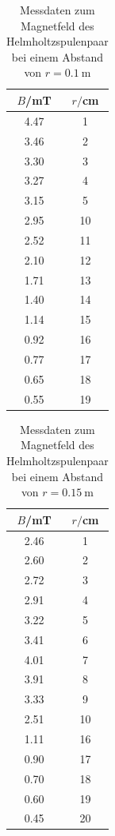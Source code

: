 \documentclass[
  bibliography=totoc,     %
  captions=tableheading,  %
  titlepage=firstiscover, %
]{scrartcl}
\begin{document}
  \newpage
  \begin{table}
    \centering
    \caption{Messdaten zum Magnetfeld des Helmholtzspulenpaar 
      bei einem Abstand von $r=\SI{0.1}{\metre}$}
    \label{tab:helmholtz1}
    \begin{tabular}{c c}
      \toprule
      $B$/mT & $r/$cm\\
      \midrule

      4.47 & 1\\
      3.46 & 2\\
      3.30 & 3\\
      3.27 & 4\\
      3.15 & 5\\
      2.95 & 10\\
      2.52 & 11\\
      2.10 & 12\\
      1.71 & 13\\
      1.40 & 14\\
      1.14 & 15\\
      0.92 & 16\\
      0.77 & 17\\
      0.65 & 18\\
      0.55 & 19\\
      
      \bottomrule
    \end{tabular}
  \end{table}

  \FloatBarrier

  \begin{table}
    \centering
    \caption{Messdaten zum Magnetfeld des Helmholtzspulenpaar 
      bei einem Abstand von $r=\SI{0.15}{\metre}$}
    \label{tab:helmholtz2}
    \begin{tabular}{c c}
      \toprule
      $B$/mT & $r/$cm\\
      \midrule
      2.46 & 1\\
      2.60 & 2\\
      2.72 & 3\\
      2.91 & 4\\
      3.22 & 5\\
      3.41 & 6\\
      4.01 & 7\\
      3.91 & 8\\
      3.33 & 9\\
      2.51 & 10\\
      1.11 & 16\\
      0.90 & 17\\
      0.70 & 18\\
      0.60 & 19\\
      0.45 & 20\\

      \bottomrule
    \end{tabular}
  \end{table}
\end{document}
